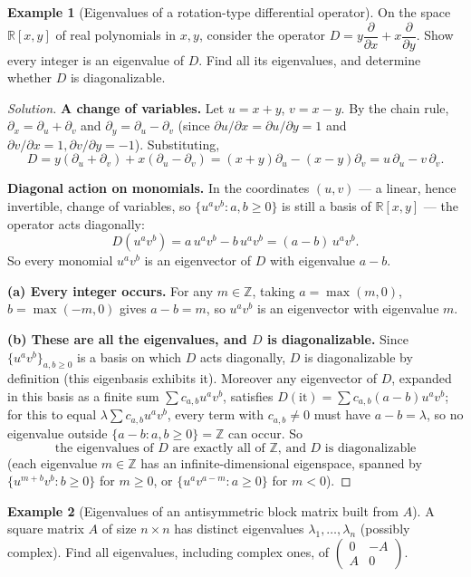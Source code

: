\documentclass[11pt]{article}
\theoremstyle{definition}
\newtheorem{example}{Example}[section]
\newcommand{\R}{\mathbb{R}}
\newcommand{\Z}{\mathbb{Z}}
\begin{document}
\begin{example}[Eigenvalues of a rotation-type differential operator]
On the space $\R[x,y]$ of real polynomials in $x,y$, consider the operator $D=y\dfrac{\partial}{\partial x}+x\dfrac{\partial}{\partial y}$. Show every integer is an eigenvalue of $D$. Find all its eigenvalues, and determine whether $D$ is diagonalizable.
\end{example}

\begin{proof}[Solution]
\textbf{A change of variables.} Let $u=x+y$, $v=x-y$. By the chain rule, $\partial_x=\partial_u+\partial_v$ and $\partial_y=\partial_u-\partial_v$ (since $\partial u/\partial x=\partial u/\partial y=1$ and $\partial v/\partial x=1,\partial v/\partial y=-1$). Substituting,
\[
D=y(\partial_u+\partial_v)+x(\partial_u-\partial_v)=(x+y)\partial_u-(x-y)\partial_v=u\,\partial_u-v\,\partial_v.
\]

\textbf{Diagonal action on monomials.} In the coordinates $(u,v)$ — a linear, hence invertible, change of variables, so $\{u^av^b:a,b\ge0\}$ is still a basis of $\R[x,y]$ — the operator acts diagonally:
\[
D(u^av^b)=a\,u^av^b-b\,u^av^b=(a-b)\,u^av^b.
\]
So every monomial $u^av^b$ is an eigenvector of $D$ with eigenvalue $a-b$.

\textbf{(a) Every integer occurs.} For any $m\in\Z$, taking $a=\max(m,0)$, $b=\max(-m,0)$ gives $a-b=m$, so $u^av^b$ is an eigenvector with eigenvalue $m$.

\textbf{(b) These are all the eigenvalues, and $D$ is diagonalizable.} Since $\{u^av^b\}_{a,b\ge0}$ is a basis on which $D$ acts diagonally, $D$ is diagonalizable by definition (this eigenbasis exhibits it). Moreover any eigenvector of $D$, expanded in this basis as a finite sum $\sum c_{a,b}u^av^b$, satisfies $D(\text{it})=\sum c_{a,b}(a-b)u^av^b$; for this to equal $\lambda\sum c_{a,b}u^av^b$, every term with $c_{a,b}\ne0$ must have $a-b=\lambda$, so no eigenvalue outside $\{a-b:a,b\ge0\}=\Z$ can occur. So
\[
\boxed{\text{the eigenvalues of } D \text{ are exactly all of } \Z\text{, and } D \text{ is diagonalizable}}
\]
(each eigenvalue $m\in\Z$ has an infinite-dimensional eigenspace, spanned by $\{u^{m+b}v^b:b\ge0\}$ for $m\ge0$, or $\{u^av^{a-m}:a\ge0\}$ for $m<0$).
\end{proof}

\begin{example}[Eigenvalues of an antisymmetric block matrix built from $A$]
A square matrix $A$ of size $n\times n$ has distinct eigenvalues $\lambda_1,\dots,\lambda_n$ (possibly complex). Find all eigenvalues, including complex ones, of $\begin{pmatrix}0&-A\\A&0\end{pmatrix}$.
\end{example}
\end{document}

